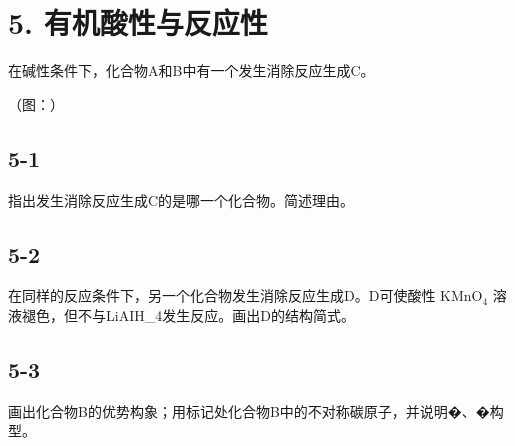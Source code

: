 \section*{5. 有机酸性与反应性}
在碱性条件下，化合物A和B中有⼀个发⽣消除反应⽣成C。

（图：）

\subsection*{5-1}
指出发⽣消除反应⽣成C的是哪⼀个化合物。简述理由。

\subsection*{5-2}
在同样的反应条件下，另⼀个化合物发⽣消除反应⽣成D。D可使酸性 $\mathrm { K M n O } _ { 4 }$ 溶液褪⾊，但不与LiAIH_{4}发⽣反应。画出D的结构简式。

\subsection*{5-3}
画出化合物B的优势构象；⽤\*标记处化合物B中的不对称碳原⼦，并说明�、�构型。
